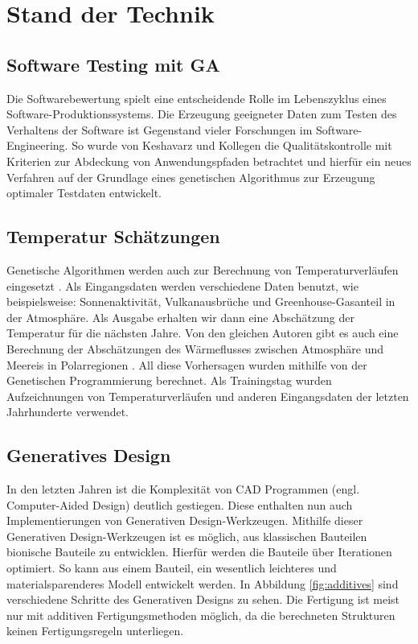 \newpage

\section{Stand der Technik}
\subsection{Software Testing mit GA}
Die Softwarebewertung spielt eine entscheidende Rolle im Lebenszyklus eines Software-Produktionssystems. Die Erzeugung geeigneter Daten zum Testen des Verhaltens der Software ist Gegenstand vieler Forschungen im Software-Engineering. So wurde von Keshavarz und Kollegen die Qualitätskontrolle mit Kriterien zur Abdeckung von Anwendungspfaden betrachtet und hierfür ein neues Verfahren auf der Grundlage eines genetischen Algorithmus zur Erzeugung optimaler Testdaten entwickelt\cite{Keshavarz}. 


\subsection{Temperatur Schätzungen}
Genetische Algorithmen werden auch zur Berechnung von Temperaturverläufen eingesetzt \cite{Stanislawska1}. Als Eingangsdaten werden verschiedene Daten benutzt, wie beispielsweise: Sonnenaktivität, Vulkanausbrüche und Greenhouse-Gasanteil in der Atmosphäre. Als Ausgabe erhalten wir dann eine Abschätzung der Temperatur für die nächsten Jahre. Von den gleichen Autoren gibt es auch eine Berechnung der Abschätzungen des Wärmeflusses zwischen Atmosphäre und Meereis in Polarregionen \cite{Stanislawska2}. All diese Vorhersagen wurden mithilfe von der Genetischen Programmierung berechnet. Als Trainingstag wurden Aufzeichnungen von Temperaturverläufen und anderen Eingangsdaten der letzten Jahrhunderte verwendet.

\subsection{Generatives Design}
In den letzten Jahren ist die Komplexität von CAD Programmen (engl. Computer-Aided Design) deutlich gestiegen. Diese enthalten nun auch Implementierungen von Generativen Design-Werkzeugen. Mithilfe dieser Generativen Design-Werkzeugen ist es möglich, aus klassischen Bauteilen bionische Bauteile zu entwicklen. Hierfür werden die Bauteile über Iterationen optimiert. So kann aus einem Bauteil, ein wesentlich leichteres und materialsparenderes Modell entwickelt werden. In Abbildung \ref{fig:additives} sind verschiedene Schritte des Generativen Designs zu sehen. Die Fertigung ist meist nur mit additiven Fertigungsmethoden möglich, da die berechneten Strukturen keinen Fertigungsregeln unterliegen\cite{caldas2008generation}. 

